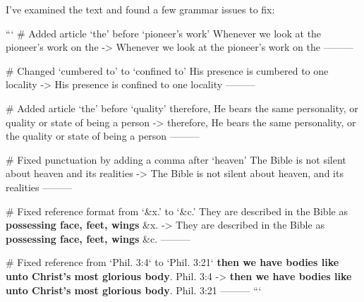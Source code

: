 I've examined the text and found a few grammar issues to fix:

```
# Added article ‘the’ before ‘pioneer's work’
Whenever we look at the pioneer's work on the 
->
Whenever we look at the pioneer's work on the 
---------

# Changed ‘cumbered to’ to ‘confined to’
His presence is cumbered to one locality
->
His presence is confined to one locality
---------

# Added article ‘the’ before ‘quality’
therefore, He bears the same personality, or quality or state of being a person
->
therefore, He bears the same personality, or the quality or state of being a person
---------

# Fixed punctuation by adding a comma after ‘heaven’
The Bible is not silent about heaven and its realities
->
The Bible is not silent about heaven, and its realities
---------

# Fixed reference format from ‘&x.’ to ‘&c.’
They are described in the Bible as \textbf{possessing face, feet, wings} \&x.
->
They are described in the Bible as \textbf{possessing face, feet, wings} \&c.
---------

# Fixed reference from ‘Phil. 3:4‘ to ‘Phil. 3:21‘
\textbf{then we have bodies like unto Christ's most glorious body}. Phil. 3:4
->
\textbf{then we have bodies like unto Christ's most glorious body}. Phil. 3:21
---------
```